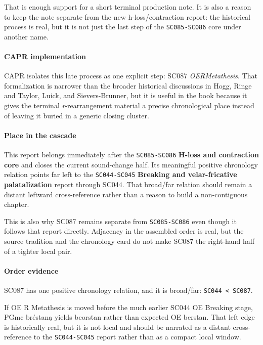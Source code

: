 \documentclass[
  british,
  a4paper,
]{article}
\begin{document}
That is enough support for a short terminal production note. It is also
a reason to keep the note separate from the new h-loss/contraction
report: the historical process is real, but it is not just the last step
of the \texttt{SC085-SC086} core under another name.

\paragraph{CAPR implementation}\label{capr-implementation-52}

CAPR isolates this late process as one explicit step: SC087
\emph{OERMetathesis}. That formalization is narrower than the broader
historical discussions in Hogg, Ringe and Taylor, Luick, and
Sievers-Brunner, but it is useful in the book because it gives the
terminal \emph{r}-rearrangement material a precise chronological place
instead of leaving it buried in a generic closing cluster.

\paragraph{Place in the cascade}\label{place-in-the-cascade-52}

This report belongs immediately after the \texttt{SC085-SC086}
\textbf{H-loss and contraction core} and closes the current sound-change
half. Its meaningful positive chronology relation points far left to the
\texttt{SC044-SC045} \textbf{Breaking and velar-fricative
palatalization} report through SC044. That broad/far relation should
remain a distant leftward cross-reference rather than a reason to build
a non-contiguous chapter.

This is also why SC087 remains separate from \texttt{SC085-SC086} even
though it follows that report directly. Adjacency in the assembled order
is real, but the source tradition and the chronology card do not make
SC087 the right-hand half of a tighter local pair.

\paragraph{Order evidence}\label{order-evidence-52}

SC087 has one positive chronology relation, and it is broad/far:
\texttt{SC044\ \textless{}\ SC087}.

If OE R Metathesis is moved before the much earlier SC044 OE Breaking
stage, PGmc bréstaną yields beorstan rather than expected OE berstan.
That left edge is historically real, but it is not local and should be
narrated as a distant cross-reference to the \texttt{SC044-SC045} report
rather than as a compact local window.
\end{document}
